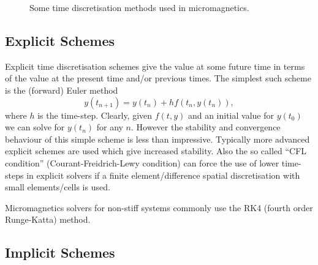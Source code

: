 \begin{figure}[\figpos]
  \centering
  \caption{Some time discretisation methods  used in micromagnetics.}
  \label{fig:types-time-disc}
\end{figure}

\subsection{Explicit Schemes}
\label{sec:explicit-schemes}

Explicit time discretisation schemes give the value at some future time in terms of the value at the present time and/or previous times. The simplest such scheme is the (forward) Euler method
\begin{equation}
  \label{eq:44}
  y(t_{n+1}) = y(t_n) + h f(t_n,y(t_n)),
\end{equation}
where $h$ is the time-step. Clearly, given $f(t,y)$ and an initial value for $y(t_0)$ we can solve for $y(t_n)$ for any $n$. However the stability and convergence behaviour of this simple scheme is less than impressive. Typically more advanced explicit schemes are used which give increased stability.\cite{Atkinson2009} Also the so called ``CFL condition'' (Courant-Freidrich-Lewy condition) can force the use of lower time-steps in explicit solvers if a finite element/difference spatial discretisation with small elements/cells is used.

Micromagnetics solvers for non-stiff systems commonly use the RK4 (fourth order Runge-Katta) method.\cite{Suess2002}


\subsection{Implicit Schemes}
\label{sec:implicit-schemes}

